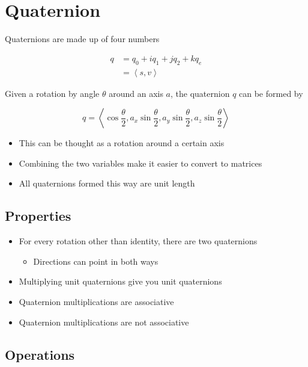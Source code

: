 \chapter{Quaternion}

Quaternions are made up of four numbers

\begin{align}
  q &= q_{0} + i q_{1} + j q_{2} + k q_{e} \\
  &= \left< s, v \right>
\end{align}

Given a rotation by angle $ \theta $ around an axis $ a $, the quaternion $ q $
can be formed by

\begin{equation}
  q =
  \left<
    \cos\frac{\theta}{2},
    a_{x} \sin\frac{\theta}{2},
    a_{y} \sin\frac{\theta}{2},
    a_{z} \sin\frac{\theta}{2}
  \right>
\end{equation}

\begin{itemize}
  \item This can be thought as a rotation around a certain axis
  \item Combining the two variables make it easier to convert to matrices
  \item All quaternions formed this way are unit length
\end{itemize}

\section{Properties}

  \begin{itemize}
    \item For every rotation other than identity, there are two quaternions
    \begin{itemize}
      \item Directions can point in both ways
    \end{itemize}

    \item Multiplying unit quaternions give you unit quaternions
    \item Quaternion multiplications are associative
    \item Quaternion multiplications are not associative
  \end{itemize}

\section{Operations}

